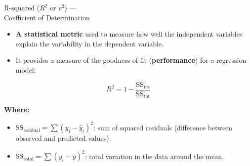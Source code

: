 \begin{frame}{R-squared ($R^2$ or $r^2$) —\\ Coefficient of Determination}
    \small
    \begin{itemize}
        \item \textbf{A statistical metric} used to measure how well the independent variables explain the variability in the dependent variable.
        \item It provides a measure of the goodness-of-fit (\textbf{performance}) for a regression model:
    \end{itemize}

    \begin{equation*}
        R^2 = 1 - \frac{\text{SS}_{\text{res}}}{\text{SS}_{\text{tot}}}
    \end{equation*}

    \textbf{Where:}
    \begin{itemize}
        \item $\text{SS}_{\text{residual}} = \sum (y_i - \hat{y}_i)^2$: sum of squared residuals (difference between observed and predicted values).
        \item $\text{SS}_{\text{total}} = \sum (y_i - \bar{y})^2$: total variation in the data around the mean.
    \end{itemize}
\end{frame}



